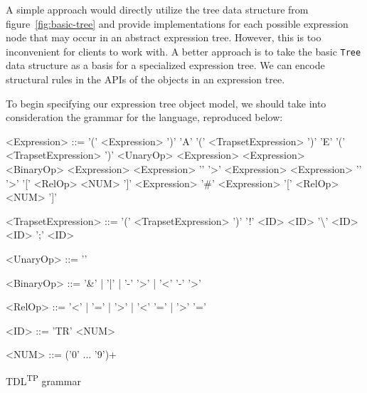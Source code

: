 \documentclass[12pt,oneside,a4paper,notitlepage]{report}
\newcommand{\texttilde}{\raisebox{0.5ex}{\texttildelow}}
\begin{document}
	\par A simple approach would directly utilize the tree data structure from figure~\ref{fig:basic-tree} and provide implementations for each possible expression node that may occur in an abstract expression tree. 
	However, this is too inconvenient for clients to work with. A better approach is to take the basic \texttt{Tree} data structure as a basis for a specialized expression tree. We can encode structural rules in the APIs of the objects in an expression tree.

	\newpage

	\par To begin specifying our expression tree object model, we should take into consideration the grammar for the language, reproduced below:

	\begin{GrammarWrapper}
		\begin{grammar}
			<Expression>	::=	'(' <Expression> ')'
			\alt 				'A' '(' <TrapsetExpression> ')'
			\alt 				'E' '(' <TrapsetExpression> ')'
			\alt 				<UnaryOp> <Expression>
			\alt 				<Expression> <BinaryOp> <Expression>
			\alt 				<Expression> '\texttilde' '\textgreater' <Expression> 
			\alt 				<Expression> '\texttilde' '\textgreater' '[' <RelOp> <NUM> ']' <Expression> 
			\alt 				'\#' <Expression> '[' <RelOp> <NUM> ']'
			
			<TrapsetExpression>	::=	'(' <TrapsetExpression> ')'
			\alt						'!' <ID>
			\alt 						<ID> '\textbackslash' <ID>
			\alt						<ID> ';' <ID>
			
			<UnaryOp>	::= '\texttilde'
			
			<BinaryOp>	::= '\&' | '|' | '-' '\textgreater' | '\textless' '-' '\textgreater'
			
			<RelOp> 	::= '\textless' | '=' | '\textgreater' | '\textless' '=' | '\textgreater' '='
			
			<ID> 		::= 'TR' <NUM>
			
			<NUM> 		::= ('0' ... '9')+
		\end{grammar}
		\caption{TDL\textsuperscript{TP} grammar}\label{bnf:modified}
	\end{GrammarWrapper}

	\newpage
\end{document}
